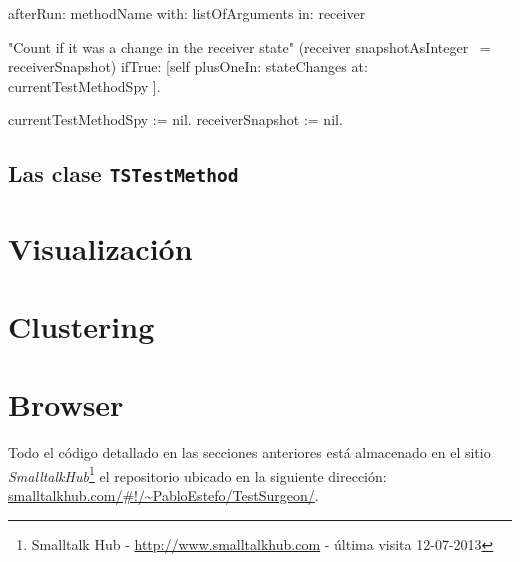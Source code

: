 \begin{codeWithLineNumbers}
afterRun: methodName with: listOfArguments in: receiver

	"Count if it was a change in the receiver state"
	(receiver snapshotAsInteger ~= receiverSnapshot) ifTrue: [self plusOneIn: stateChanges at: currentTestMethodSpy ]. 

	currentTestMethodSpy := nil.
	receiverSnapshot := nil.

\end{codeWithLineNumbers}\label{code:after-run}


\subsection{Las clase {\tt TSTestMethod} }

\section{Visualización}

\section{Clustering}

\section{Browser}


\par Todo el código detallado en las secciones anteriores está almacenado en el sitio \emph{SmalltalkHub}\footnote{Smalltalk Hub - \url{http://www.smalltalkhub.com} - última visita 12-07-2013 } el repositorio ubicado en la siguiente dirección: \url{smalltalkhub.com/#!/~PabloEstefo/TestSurgeon/}. 